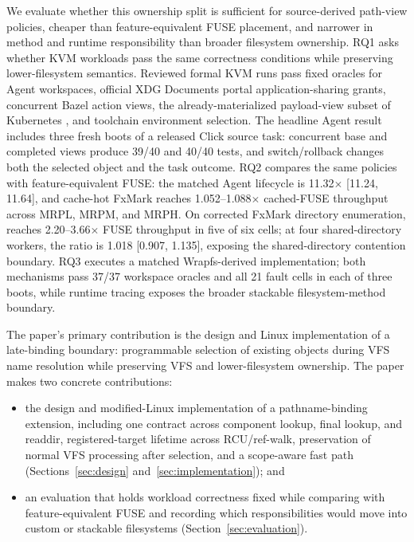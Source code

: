 We evaluate whether this ownership split is sufficient for source-derived
path-view policies, cheaper than feature-equivalent FUSE placement, and
narrower in method and runtime responsibility than broader filesystem
ownership. RQ1 asks whether KVM workloads pass
the same correctness conditions while preserving lower-filesystem semantics.
Reviewed formal KVM runs pass fixed oracles for Agent workspaces, official XDG
Documents portal application-sharing grants, concurrent Bazel action views, the
already-materialized payload-view subset of Kubernetes ,
and toolchain environment selection. The headline Agent result includes three
fresh boots of
a released Click source task: concurrent base and completed views produce
39/40 and 40/40 tests, and switch/rollback changes both the selected object and
the task outcome. RQ2 compares
the same policies with feature-equivalent FUSE: the matched Agent lifecycle is
11.32\(\times\) [11.24, 11.64], and cache-hot FxMark  reaches
1.052--1.088\(\times\) cached-FUSE throughput across MRPL, MRPM, and MRPH.
On corrected FxMark directory enumeration,  reaches
2.20--3.66\(\times\) FUSE throughput in five of six cells; at four
shared-directory workers, the ratio is 1.018 [0.907, 1.135], exposing the
shared-directory contention boundary.
RQ3 executes a matched
Wrapfs-derived implementation; both mechanisms pass 37/37 workspace oracles
and all 21 fault cells in each of three boots, while runtime tracing exposes
the broader stackable filesystem-method boundary.

The paper's primary contribution is the design and Linux implementation of a
late-binding boundary: programmable selection of existing objects during VFS
name resolution while preserving VFS and lower-filesystem ownership.
The paper makes two concrete contributions:
\begin{itemize}
\item the design and modified-Linux implementation of a pathname-binding
extension, including one contract across component lookup, final lookup, and
readdir, registered-target lifetime across RCU/ref-walk, preservation of normal
VFS processing after selection, and a scope-aware fast path
(Sections~\ref{sec:design}
and~\ref{sec:implementation}); and
\item an evaluation that holds workload correctness fixed while comparing
\namei with feature-equivalent FUSE and recording which responsibilities would
move into custom or stackable filesystems (Section~\ref{sec:evaluation}).
\end{itemize}
